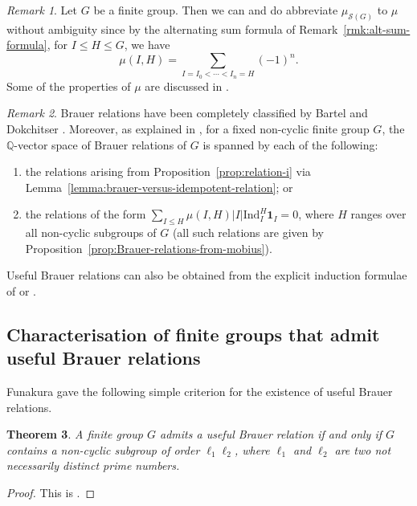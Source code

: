 \documentclass[12pt]{amsart}
\theoremstyle{plain}
\newtheorem{theorem}{Theorem}[section]
\theoremstyle{remark}
\newtheorem{remark}[theorem]{Remark}
\theoremstyle{definition}
\newcommand{\Q}{\mathbb{Q}}
\newcommand{\Ind}{\mathrm{Ind}}
\numberwithin{equation}{section}
\begin{document}
\begin{remark}\label{rmk:all-subgroups}
Let $G$ be a finite group. Then we can and do abbreviate $\mu_{\mathcal{S}(G)}$ to $\mu$
without ambiguity since by the alternating sum formula of Remark~\ref{rmk:alt-sum-formula}, 
for $I \leq H \leq G$, we have
\[
\mu(I,H) = \sum_{I=I_{0} < \cdots < I_{n}=H} (-1)^{n}.
\]
Some of the properties of $\mu$ are discussed in 
\cite[Remark~3.7 and Lemma~3.8]{MR2032439}.
\end{remark}

\begin{remark}
Brauer relations have been completely classified by Bartel and Dokchitser  \cite{MR3420514,MR3200364}. 
Moreover, as explained in \cite[Remark~3.6]{MR2032439}, for a fixed non-cyclic finite group $G$,
the $\Q$-vector space of Brauer relations of $G$ is spanned by each of the following:\begin{enumerate}
\item the relations arising from Proposition~\ref{prop:relation-i} via 
Lemma~\ref{lemma:brauer-versus-idempotent-relation}; or
\item the relations of the form
$\sum_{I \leq H} \mu(I,H) |I| \Ind_{I}^{H}\mathbf{1}_{I} = 0$,
where $H$ ranges over all non-cyclic subgroups of $G$
(all such relations are given by Proposition~\ref{prop:Brauer-relations-from-mobius}).
\end{enumerate}
Useful Brauer relations can also be obtained from the explicit induction formulae
of \cite[Theorem~2.16(i)]{MR969240} or \cite[Corollary~2.22]{MR1051242}.
\end{remark}

\subsection{Characterisation of finite groups that admit useful Brauer relations}\label{subsec:char-admit-useful-Brauer}
Funakura gave the following simple criterion for the existence of useful Brauer relations.

\begin{theorem}\cite{MR511862}\label{thm:conditionbrauer}
A finite group $G$ admits a useful Brauer relation if and only if $G$ contains 
a non-cyclic subgroup of order $\ell_{1}\ell_{2}$,
where $\ell_{1}$ and $\ell_{2}$ are two not necessarily distinct prime numbers. 
\end{theorem}

\begin{proof}
This is \cite[Theorem 9 and Remark after Theorem 20]{MR511862}.
\end{proof}
\end{document}

